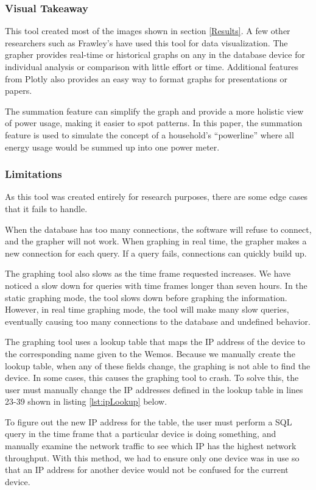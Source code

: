 \subsubsection{Visual Takeaway}
This tool created most of the images shown in section \ref{Results}. A few other researchers such as Frawley's have used this tool for data visualization. The grapher provides real-time or historical graphs on any in the database device for individual analysis or comparison with little effort or time. Additional features from Plotly also provides an easy way to format graphs for presentations or papers.

The summation feature can simplify the graph and provide a more holistic view of power usage, making it easier to spot patterns. In this paper, the summation feature is used to simulate the concept of a household's ``powerline'' where all energy usage would be summed up into one power meter.

\subsubsection{Limitations}
As this tool was created entirely for research purposes, there are some edge cases that it fails to handle.

When the database has too many connections, the software will refuse to connect, and the grapher will not work. When graphing in real time, the grapher makes a new connection for each query. If a query fails, connections can quickly build up.

The graphing tool also slows as the time frame requested increases. We have noticed a slow down for queries with time frames longer than seven hours. In the static graphing mode, the tool slows down before graphing the information. However, in real time graphing mode, the tool will make many slow queries, eventually causing too many connections to the database and undefined behavior.

The graphing tool uses a lookup table that maps the IP address of the device to the corresponding name given to the Wemos. Because we manually create the lookup table, when any of these fields change, the graphing is not able to find the device. In some cases, this causes the graphing tool to crash. To solve this, the user must manually change the IP addresses defined in the lookup table in lines 23-39 shown in listing \ref{lst:ipLookup} below.

To figure out the new IP address for the table, the user must perform a SQL query in the time frame that a particular device is doing something, and manually examine the network traffic to see which IP has the highest network throughput. With this method, we had to ensure only one device was in use so that an IP address for another device would not be confused for the current device.

